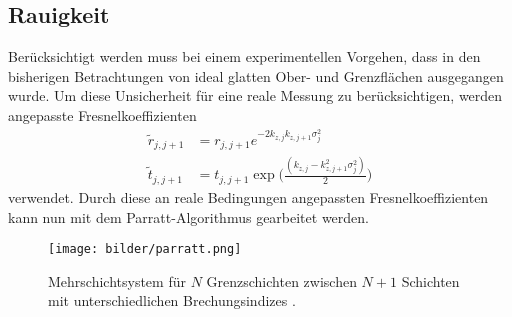 \subsection{Rauigkeit}
Berücksichtigt werden muss bei einem experimentellen Vorgehen, dass in den bisherigen Betrachtungen von ideal glatten Ober- und Grenzflächen ausgegangen wurde. Um diese Unsicherheit für eine reale Messung zu berücksichtigen, werden angepasste Fresnelkoeffizienten
\begin{align}
  \tilde{r}_{j,j+1}&=r_{j,j+1}e^{-2k_{z,j}k_{z,j+1}\sigma_j^2}\\
  \tilde{t}_{j,j+1}&=t_{j,j+1}\exp\biggl(\frac{(k_{z,j}-k_{z,j+1}^2\sigma_j^2)}{2}\biggr)
\end{align}
verwendet. Durch diese an reale Bedingungen angepassten Fresnelkoeffizienten kann nun mit dem Parratt-Algorithmus gearbeitet werden.
\begin{figure}[H]
  \centering
  \texttt{[image: bilder/parratt.png]}
  \caption{Mehrschichtsystem für $N$ Grenzschichten zwischen $N+1$ Schichten mit unterschiedlichen Brechungsindizes \cite{anleitung}.}
  \label{parratt}
\end{figure}
